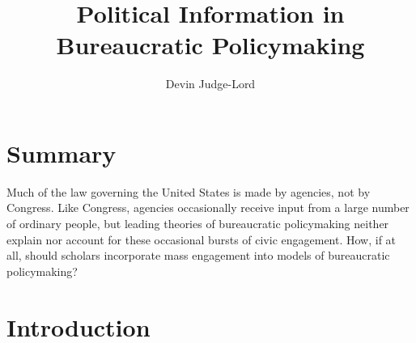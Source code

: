 \documentclass{article}
\title{Political Information in Bureaucratic Policymaking}
\author{Devin Judge-Lord} %
\begin{document}
\maketitle
\abstract{}















\newpage
\large
\tableofcontents
 \normalsize

\newpage
\section*{Summary}

Much of the law governing the United States is made by agencies, not by Congress. Like Congress, agencies occasionally receive input from a large number of ordinary people, but leading theories of bureaucratic policymaking neither explain nor account for these occasional bursts of civic engagement.
How, if at all, should scholars incorporate mass engagement into models of bureaucratic policymaking? %


\doublespace
% 

\newpage
\section{Introduction} \label{intro}


\end{document}
